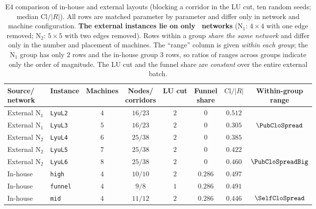 \begin{table}[t]
\centering
\caption{E4 comparison of in-house and external layouts (blocking a corridor in the LU cut, ten random seeds; median \(\mathrm{Cl}/|R|\)).
All rows are matched parameter by parameter and differ only in network and machine configuration. \textbf{The external instances lie on only \NPubNets\ networks}
(\(\mathrm{N}_1\): \(4\times 4\) with one edge removed; \(\mathrm{N}_2\): \(5\times 5\) with two edges removed).
Rows within a group \emph{share the same network} and differ only in the number and placement of machines. The ``range'' column is given \emph{within each group};
the \(\mathrm{N}_1\) group has only \(2\) rows and the in-house group \(3\) rows, so ratios of ranges across groups indicate only the order of magnitude.
The LU cut and the funnel share are \emph{constant} over the entire external batch.}
\label{tab:e4pub}
\small
\begin{tabular}{@{}llcccccc@{}}
\toprule
\makecell{Source/\\network} & Instance & Machines & \makecell{Nodes/\\corridors} & LU cut & \makecell{Funnel\\share} & \(\mathrm{Cl}/|R|\)
 & \makecell{Within-group\\range} \\
\midrule
External \(\mathrm{N}_1\) & \texttt{LyuL2} & \(4\) & \(16/23\) & \(2\) & \(0\) & \(0.512\) & \\
External \(\mathrm{N}_1\) & \texttt{LyuL3} & \(5\) & \(16/23\) & \(2\) & \(0\) & \(0.305\)
  & \(\PubCloSpread\) \\
\cmidrule{1-8}
External \(\mathrm{N}_2\) & \texttt{LyuL4} & \(6\) & \(25/38\) & \(2\) & \(0\) & \(0.385\) & \\
External \(\mathrm{N}_2\) & \texttt{LyuL5} & \(7\) & \(25/38\) & \(2\) & \(0\) & \(0.422\) & \\
External \(\mathrm{N}_2\) & \texttt{LyuL6} & \(8\) & \(25/38\) & \(2\) & \(0\) & \(0.460\)
  & \(\PubCloSpreadBig\) \\
\midrule
In-house & \texttt{high} & \(4\) & \(10/10\) & \(2\) & \(0.286\) & \(0.497\) & \\
In-house & \texttt{funnel} & \(4\) & \(9/8\) & \(1\) & \(0.286\) & \(0.491\) & \\
In-house & \texttt{mid} & \(4\) & \(11/12\) & \(2\) & \(0.286\) & \(0.446\)
  & \(\SelfCloSpread\) \\
\bottomrule
\end{tabular}
\end{table}


